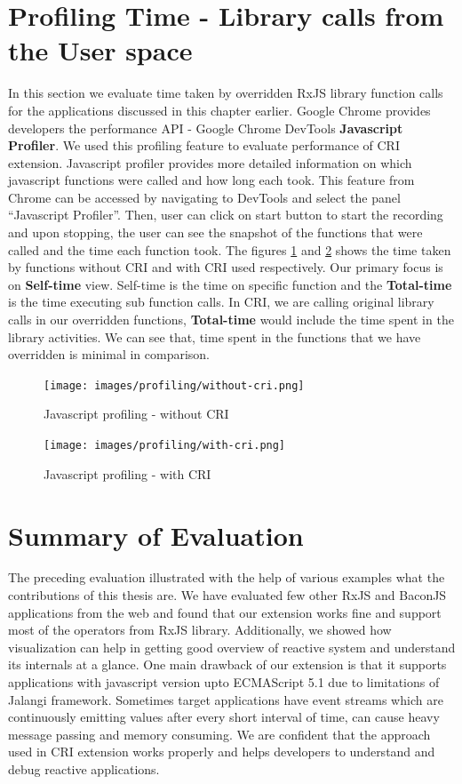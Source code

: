 \section{Profiling Time - Library calls from the User space}
In this section we evaluate time taken by overridden RxJS library function calls for the applications discussed in this chapter earlier. Google Chrome provides developers the performance API - Google Chrome DevTools \textbf{Javascript Profiler}\cite{jsprofiler}. We used this profiling feature to evaluate performance of CRI extension. Javascript profiler provides more detailed information on which javascript functions were called and how long each took. This feature from Chrome can be accessed by navigating to DevTools and select the panel ``Javascript Profiler''. Then, user can click on start button to start the recording and upon stopping, the user can see the snapshot of the functions that were called and the time each function took. The figures \ref{fig:prof-without-cri} and \ref{fig:prof-with-cri} shows the time taken by functions without CRI and with CRI used respectively. Our primary focus is on \textbf{Self-time} view. Self-time is the time on specific function and the \textbf{Total-time} is the time executing sub function calls. In CRI, we are calling original library calls in our overridden functions, \textbf{Total-time} would include the time spent in the library activities. We can see that, time spent in the functions that we have overridden is minimal in comparison.

\begin{figure}[!h]
	\centering
	\texttt{[image: images/profiling/without-cri.png]}
	\caption{Javascript profiling - without CRI}
	\label{fig:prof-without-cri}
\end{figure}
\begin{figure}[!h]
	\centering
	\texttt{[image: images/profiling/with-cri.png]}
	\caption{Javascript profiling - with CRI}
	\label{fig:prof-with-cri}
\end{figure}

\section{Summary of Evaluation}
The preceding evaluation illustrated with the help of various examples what the contributions of this thesis are. We have evaluated few other RxJS and BaconJS applications from the web and found that our extension works fine and support most of the operators from RxJS library. Additionally, we showed how visualization can help in getting good overview of reactive system and understand its internals at a glance. One main drawback of our extension is that it supports applications with javascript version upto ECMAScript 5.1\cite{es5} due to limitations of Jalangi framework\cite{jalangiissue}. Sometimes target applications have event streams which are continuously emitting values after every short interval of time, can cause heavy message passing and memory consuming. We are confident that the approach used in CRI extension works properly and helps developers to understand and debug reactive applications. 
